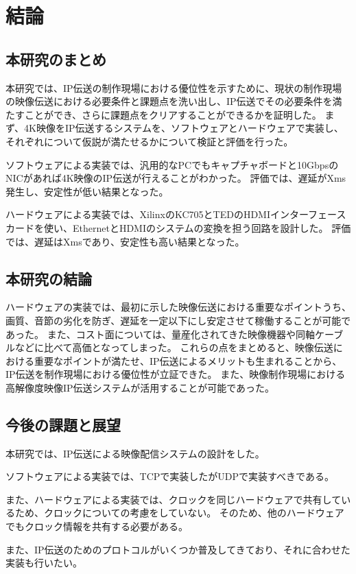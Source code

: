 \chapter{結論}
\label{chap:conclusion}

\section{本研究のまとめ}

本研究では、IP伝送の制作現場における優位性を示すために、現状の制作現場の映像伝送における必要条件と課題点を洗い出し、IP伝送でその必要条件を満たすことができ、さらに課題点をクリアすることができるかを証明した。
まず、4K映像をIP伝送するシステムを、ソフトウェアとハードウェアで実装し、それぞれについて仮説が満たせるかについて検証と評価を行った。

ソフトウェアによる実装では、汎用的なPCでもキャプチャボードと10GbpsのNICがあれば4K映像のIP伝送が行えることがわかった。
評価では、遅延がXms発生し、安定性が低い結果となった。

ハードウェアによる実装では、XilinxのKC705とTEDのHDMIインターフェースカードを使い、EthernetとHDMIのシステムの変換を担う回路を設計した。
評価では、遅延はXmsであり、安定性も高い結果となった。

\section{本研究の結論}

ハードウェアの実装では、最初に示した映像伝送における重要なポイントうち、画質、音節の劣化を防ぎ、遅延を一定以下にし安定させて稼働することが可能であった。
また、コスト面については、量産化されてきた映像機器や同軸ケーブルなどに比べて高価となってしまった。
これらの点をまとめると、映像伝送における重要なポイントが満たせ、IP伝送によるメリットも生まれることから、IP伝送を制作現場における優位性が立証できた。
また、映像制作現場における高解像度映像IP伝送システムが活用することが可能であった。

\section{今後の課題と展望}

本研究では、IP伝送による映像配信システムの設計をした。

ソフトウェアによる実装では、TCPで実装したがUDPで実装すべきである。

また、ハードウェアによる実装では、クロックを同じハードウェアで共有しているため、クロックについての考慮をしていない。
そのため、他のハードウェアでもクロック情報を共有する必要がある。

また、IP伝送のためのプロトコルがいくつか普及してきており、それに合わせた実装も行いたい。

